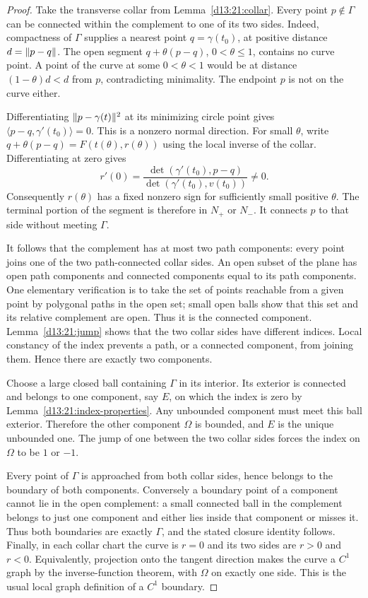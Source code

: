 \documentclass[11pt,oneside]{book}
\theoremstyle{definition}
\theoremstyle{remark}\newtheorem{remark}[theorem]{Remark}
\newcommand{\ip}[2]{\langle#1,#2\rangle}
\begin{document}
\begin{proof}
Take the transverse collar from Lemma~\ref{d13:21:collar}.
Every point $p\notin\Gamma$ can be connected within the complement
to one of its two sides. Indeed, compactness of $\Gamma$ supplies a
nearest point $q=\gamma(t_0)$, at positive distance
$d=\lVert p-q\rVert$. The open segment $q+\theta(p-q)$, $0<\theta\leq1$,
contains no curve point. A point of the curve at some
$0<\theta<1$ would be at distance $(1-\theta)d<d$ from $p$,
contradicting minimality. The endpoint $p$ is not on the curve either.

Differentiating $\lVert p-\gamma(t)\rVert^2$ at its minimizing circle
point gives $\ip{p-q}{\gamma'(t_0)}=0$. This is a nonzero normal
direction. For small $\theta$, write
$q+\theta(p-q)=F(t(\theta),r(\theta))$ using the local inverse
of the collar. Differentiating at zero gives
\[
 r'(0)=\frac{\det(\gamma'(t_0),p-q)}
                   {\det(\gamma'(t_0),v(t_0))}\ne0.
\]
Consequently $r(\theta)$ has a fixed nonzero sign for sufficiently
small positive $\theta$. The terminal portion of the segment is
therefore in $N_+$ or $N_-$. It connects $p$ to that side without
meeting $\Gamma$.

It follows that the complement has at most two path components: every
point joins one of the two path-connected collar sides. An open subset
of the plane has open path components and connected components equal
to its path components. One elementary verification is to take the
set of points reachable from a given point by polygonal paths in the
open set; small open balls show that this set and its relative
complement are open. Thus it is the connected component.
Lemma~\ref{d13:21:jump} shows that the two collar sides have different
indices. Local constancy of the index prevents a path, or a connected
component, from joining them. Hence there are exactly two components.

Choose a large closed ball containing $\Gamma$ in its interior. Its
exterior is connected and belongs to one component, say $E$, on
which the index is zero by Lemma~\ref{d13:21:index-properties}.
Any unbounded component must meet this ball exterior. Therefore the
other component $\Omega$ is bounded, and $E$ is the unique unbounded
one. The jump of one between the two collar sides forces the index
on $\Omega$ to be $1$ or $-1$.

Every point of $\Gamma$ is approached from both collar sides, hence
belongs to the boundary of both components. Conversely a boundary
point of a component cannot lie in the open complement: a small
connected ball in the complement belongs to just one component and
either lies inside that component or misses it. Thus both boundaries
are exactly $\Gamma$, and the stated closure identity follows.
Finally, in each collar chart the curve is $r=0$ and its two sides
are $r>0$ and $r<0$. Equivalently, projection onto the tangent
direction makes the curve a $C^1$ graph by the inverse-function
theorem, with $\Omega$ on exactly one side. This is the usual local
graph definition of a $C^1$ boundary.
\end{proof}
\end{document}
